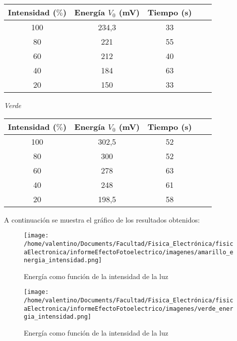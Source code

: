 \documentclass[a4paper]{article}
\begin{document}
        \begin{tabular}{ c c c c c }
            \toprule
            Intensidad ($\%$) & Energía $V_{0}$ (mV) & Tiempo (s) \\
              \midrule
              100 & 234,3 & 33\\
              80 & 221 & 55\\
              60 & 212 & 40\\
              40 & 184 & 63\\
              20 & 150 & 33\\
            \bottomrule
          \end{tabular}
      

          \begin{minipage}[c]{7.5cm}
            \vspace{5mm}
            \centering
            \textit{Verde} 
            \vspace{2mm}
          \end{minipage}

          \begin{tabular}{ c c c c c }
            \toprule
            Intensidad ($\%$) & Energía $V_{0}$ (mV) & Tiempo (s) \\
              \midrule
              100 & 302,5 &    52   \\
              80 & 300    &    52   \\
              60 & 278    &    63   \\
              40 & 248    &    61   \\
              20 & 198,5  &    58   \\
            \bottomrule
          \end{tabular}

        \indent A continuación se muestra el gráfico de los resultados obtenidos:
        \vspace{0mm}

        \begin{figure}[h]
          \centering
          \texttt{[image: /home/valentino/Documents/Facultad/Fisica\_Electrónica/fisicaElectronica/informeEfectoFotoelectrico/imagenes/amarillo\_energia\_intensidad.png]}
          \caption{\small Energía como función de la intensidad de la luz}
        \end{figure}

        \begin{figure}[h]
          \centering
          \texttt{[image: /home/valentino/Documents/Facultad/Fisica\_Electrónica/fisicaElectronica/informeEfectoFotoelectrico/imagenes/verde\_energia\_intensidad.png]}
          \caption{\small Energía como función de la intensidad de la luz}
        \end{figure}
        \newpage
        
\end{document}
